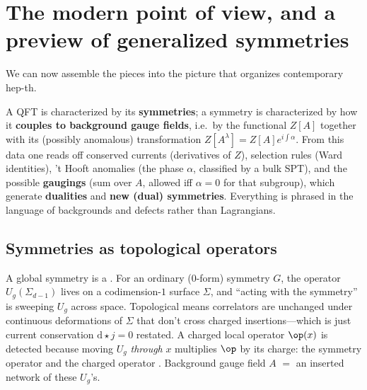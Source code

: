 \documentclass[11pt]{article}
\newcommand{\dd}{\mathrm{d}}                 %
\begin{document}
\section{The modern point of view, and a preview of generalized symmetries}
\label{sec:higherform}

We can now assemble the pieces into the picture that organizes contemporary hep-th.

\begin{eequation}
A QFT is characterized by its \textbf{symmetries}; a symmetry is characterized by how it
\textbf{couples to background gauge fields}, i.e.\ by the functional $Z[A]$ together with
its (possibly anomalous) transformation $Z[A^\lambda]=Z[A]e^{i\int\alpha}$. From this
data one reads off conserved currents (derivatives of $Z$), selection rules (Ward
identities), 't Hooft anomalies (the phase $\alpha$, classified by a bulk SPT), and the
possible \textbf{gaugings} (sum over $A$, allowed iff $\alpha=0$ for that subgroup),
which generate \textbf{dualities} and \textbf{new (dual) symmetries}. Everything is
phrased in the language of backgrounds and defects rather than Lagrangians.
\end{eequation}

\subsection{Symmetries as topological operators}

\begin{iidea}
A global symmetry is a . For an ordinary ($0$-form)
symmetry $G$, the operator $U_g(\Sigma_{d-1})$ lives on a codimension-$1$ surface
$\Sigma$, and ``acting with the symmetry'' is sweeping $U_g$ across space. Topological
means correlators are unchanged under continuous deformations of $\Sigma$ that don't
cross charged insertions---which is just current conservation $\dd\star j=0$ restated.
A charged local operator $\op(x)$ is detected because moving $U_g$ \emph{through} $x$
multiplies $\op$ by its charge: the symmetry operator and the charged operator
. Background gauge field $A$ $=$ an inserted network of these $U_g$'s.
\end{iidea}
\end{document}
